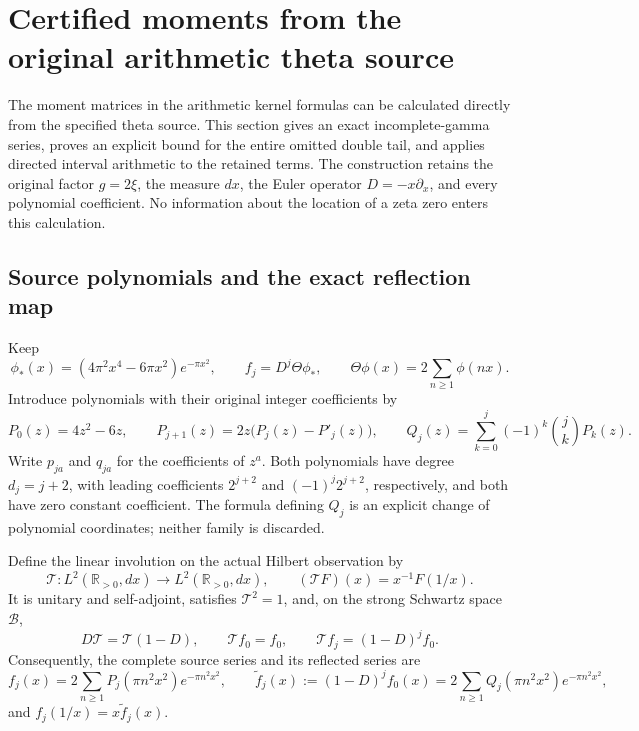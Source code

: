 \section{Certified moments from the original arithmetic theta source}
\label{sec:arithmetic-moments}

The moment matrices in the arithmetic kernel formulas can be calculated
directly from the specified theta source.  This section gives an exact
incomplete-gamma series, proves an explicit bound for the entire omitted
double tail, and applies directed interval arithmetic to the retained
terms.  The construction retains the original factor \(g=2\xi\), the
measure \(dx\), the Euler operator \(D=-x\partial_x\), and every
polynomial coefficient.  No information about the location of a zeta
zero enters this calculation.

\subsection{Source polynomials and the exact reflection map}

Keep
\[
 \phi_*(x)=(4\pi^2x^4-6\pi x^2)e^{-\pi x^2},\qquad
 f_j=D^j\Theta\phi_*,\qquad
 \Theta\phi(x)=2\sum_{n\geq1}\phi(nx).
 \tag{AM.1}
\]
Introduce polynomials with their original integer coefficients by
\[
 P_0(z)=4z^2-6z,\qquad
 P_{j+1}(z)=2z\bigl(P_j(z)-P'_j(z)\bigr),\qquad
 Q_j(z)=\sum_{k=0}^j(-1)^k\binom jkP_k(z).
 \tag{AM.2}
\]
Write \(p_{ja}\) and \(q_{ja}\) for the coefficients of \(z^a\).
Both polynomials have degree \(d_j=j+2\), with leading coefficients
\(2^{j+2}\) and \((-1)^j2^{j+2}\), respectively, and both have zero
constant coefficient.  The formula defining \(Q_j\) is an explicit
change of polynomial coordinates; neither family is discarded.

Define the linear involution on the actual Hilbert observation by
\[
 \mathcal T:L^2(\mathbb R_{>0},dx)\longrightarrow
 L^2(\mathbb R_{>0},dx),\qquad
 (\mathcal TF)(x)=x^{-1}F(1/x).
 \tag{AM.3}
\]
It is unitary and self-adjoint, satisfies \(\mathcal T^2=1\), and,
on the strong Schwartz space \(\mathscr B\),
\[
 D\mathcal T=\mathcal T(1-D),\qquad
 \mathcal Tf_0=f_0,\qquad
 \mathcal Tf_j=(1-D)^jf_0.
 \tag{AM.4}
\]
Consequently, the complete source series and its reflected series are
\[
 f_j(x)=2\sum_{n\geq1}P_j(\pi n^2x^2)e^{-\pi n^2x^2},\qquad
 \widetilde f_j(x):=(1-D)^jf_0(x)
   =2\sum_{n\geq1}Q_j(\pi n^2x^2)e^{-\pi n^2x^2},
 \tag{AM.5}
\]
and \(f_j(1/x)=x\widetilde f_j(x)\).

